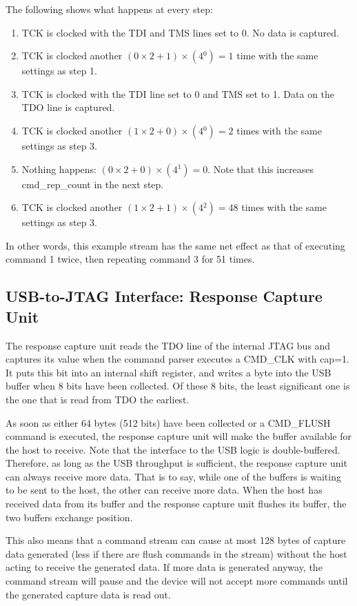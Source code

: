 \documentclass[main\_\_EN.tex]{subfiles}
\begin{document}
The following shows what happens at every step:

\begin{enumerate}
\item TCK is clocked with the TDI and TMS lines set to 0. No data is captured.
\item TCK is clocked another \((0\times2+1)\times(4{^0})=1\) time with the same settings as step 1.
\item TCK is clocked with the TDI line set to 0 and TMS set to 1. Data on the TDO line is captured.
\item TCK is clocked another \((1\times2+0)\times(4{^0})=2\) times with the same settings as step 3.
\item Nothing happens: \((0\times2+0)\times(4{^1})=0\). Note that this increases cmd\_rep\_count in the next step.
\item TCK is clocked another \((1\times2+1)\times(4{^2})=48\) times with the same settings as step 3.
\end{enumerate}

In other words, this example stream has the same net effect as that of executing command 1 twice, then repeating command 3 for 51 times.

\subsection{USB-to-JTAG Interface: Response Capture Unit}

The response capture unit reads the TDO line of the internal JTAG bus and captures its value when the command parser executes a CMD\_CLK with cap=1. It puts this bit into an internal shift register, and writes a byte into the USB buffer when 8 bits have been collected. Of these 8 bits, the least significant one is the one that is read from TDO the earliest.

As soon as either 64 bytes (512 bits) have been collected or a CMD\_FLUSH command is executed, the response capture unit will make the buffer available for the host to receive. Note that the interface to the USB logic is double-buffered. Therefore, as long as the USB throughput is sufficient, the response capture unit can always receive more data. That is to say, while one of the buffers is waiting to be sent to the host, the other can receive more data. When the host has received data from its buffer and the response capture unit flushes its buffer, the two buffers exchange position.

This also means that a command stream can cause at most 128 bytes of capture data generated (less if there are flush commands in the stream) without the host acting to receive the generated data. If more data is generated anyway, the command stream will pause and the device will not accept more commands until the generated capture data is read out.
\end{document}
